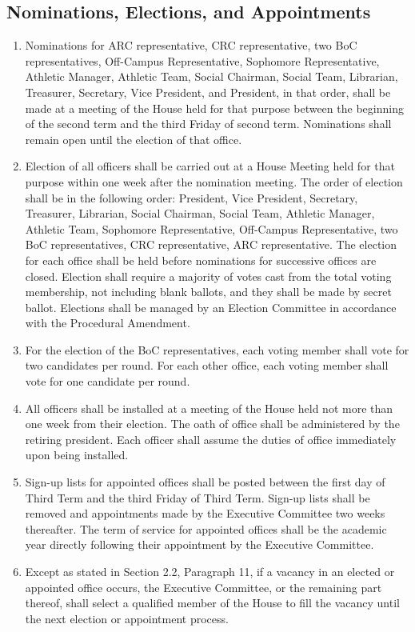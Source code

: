 \documentclass[10pt]{article} %
\begin{document}
\subsection{Nominations, Elections, and Appointments}
\begin{enumerate}
\item Nominations for ARC representative, CRC representative, two BoC representatives, Off-Campus Representative, Sophomore Representative, Athletic Manager, Athletic Team, Social Chairman, Social Team, Librarian, Treasurer, Secretary, Vice President, and President, in that order, shall be made at a meeting of the House held for that purpose between the beginning of the second term and the third Friday of second term. Nominations shall remain open until the election of that office.
\item Election of all officers shall be carried out at a House Meeting held for that purpose within one week after the nomination meeting. The order of election shall be in the following order: President, Vice President, Secretary, Treasurer, Librarian, Social Chairman, Social Team, Athletic Manager, Athletic Team, Sophomore Representative, Off-Campus Representative, two BoC representatives, CRC representative, ARC representative. The election for each office shall be held before nominations for successive offices are closed. Election shall require a majority of votes cast from the total voting membership, not including blank ballots, and they shall be made by secret ballot. Elections shall be managed by an Election Committee in accordance with the Procedural Amendment.
\item For the election of the BoC representatives, each voting member shall vote for two candidates per round. For each other office, each voting member shall vote for one candidate per round.
\item All officers shall be installed at a meeting of the House held not more than one week from their election. The oath of office shall be administered by the retiring president. Each officer shall assume the duties of office immediately upon being installed.
\item Sign-up lists for appointed offices shall be posted between the first day of Third Term and the third Friday of Third Term. Sign-up lists shall be removed and appointments made by the Executive Committee two weeks thereafter. The term of service for appointed offices shall be the academic year directly following their appointment by the Executive Committee.
\item Except as stated in Section 2.2, Paragraph 11, if a vacancy in an elected or appointed office occurs, the Executive Committee, or the remaining part thereof, shall select a qualified member of the House to fill the vacancy until the next election or appointment process.
\end{enumerate}
\end{document}
